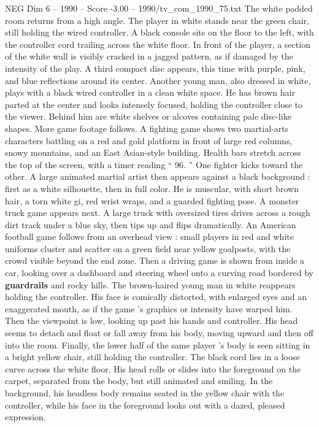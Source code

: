 \begin{textsample}{NEG Dim 6 – 1990 – Score -3.00 – 1990/tv\_com\_1990\_75.txt}
The white padded room returns from a high angle.
The player in white stands near the green chair, still holding the wired controller.
A black console sits on the floor to the left, with the controller cord trailing across the white floor.
In front of the player, a section of the white wall is visibly cracked in a jagged pattern, as if damaged by the intensity of the play.
A third compact disc appears, this time with purple, pink, and blue reflections around its center.
Another young man, also dressed in white, plays with a black wired controller in a clean white space.
He has brown hair parted at the center and looks intensely focused, holding the controller close to the viewer.
Behind him are white shelves or alcoves containing pale disc-like shapes.
More game footage follows.
A fighting game shows two martial-arts characters battling on a red and gold platform in front of large red columns, snowy mountains, and an East Asian-style building.
Health bars stretch across the top of the screen, with a timer reading “ 96. ” One fighter kicks toward the other.
A large animated martial artist then appears against a black background : first as a white silhouette, then in full color.
He is muscular, with short brown hair, a torn white gi, red wrist wraps, and a guarded fighting pose.
A monster truck game appears next.
A large truck with oversized tires drives across a rough dirt track under a blue sky, then tips up and flips dramatically.
An American football game follows from an overhead view : small players in red and white uniforms cluster and scatter on a green field near yellow goalposts, with the crowd visible beyond the end zone.
Then a driving game is shown from inside a car, looking over a dashboard and steering wheel onto a curving road bordered by \textbf{guardrails} and rocky hills.
The brown-haired young man in white reappears holding the controller.
His face is comically distorted, with enlarged eyes and an exaggerated mouth, as if the game ’s graphics or intensity have warped him.
Then the viewpoint is low, looking up past his hands and controller.
His head seems to detach and float or fall away from his body, moving upward and then off into the room.
Finally, the lower half of the same player ’s body is seen sitting in a bright yellow chair, still holding the controller.
The black cord lies in a loose curve across the white floor.
His head rolls or slides into the foreground on the carpet, separated from the body, but still animated and smiling.
In the background, his headless body remains seated in the yellow chair with the controller, while his face in the foreground looks out with a dazed, pleased expression.

\end{textsample}
